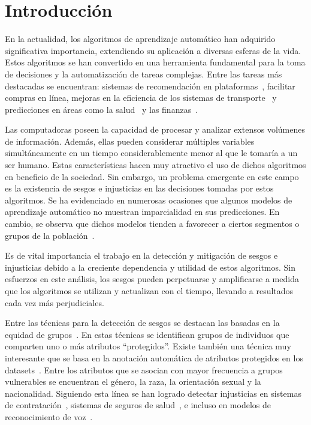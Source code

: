 \chapter*{Introducción}\label{chapter:introduction}
En la actualidad, los algoritmos de aprendizaje autom\'atico han adquirido significativa importancia, extendiendo su aplicaci\'on a 
diversas esferas de la vida. Estos algoritmos se han convertido en una herramienta fundamental para la toma de decisiones y la 
automatizaci\'on de tareas complejas. Entre las tareas m\'as destacadas se encuentran: sistemas de recomendaci\'on en 
plataformas~\parencite{esmaeilzadeh2022abuse, bhattacharya2022augmenting}, facilitar compras en l\'inea, mejoras en la eficiencia 
de los sistemas de transporte~\parencite{autonomous_driving} y predicciones en \'areas como la salud~\parencite{roy2023machine} y 
las finanzas~\parencite{sen2021machine}.

Las computadoras poseen la capacidad de procesar y analizar extensos vol\'umenes de informaci\'on. Adem\'as, ellas pueden considerar 
m\'ultiples variables simult\'aneamente en un tiempo considerablemente menor al que le tomar\'ia a un ser humano. Estas caracter\'isticas 
hacen muy atractivo el uso de dichos algoritmos en beneficio de la sociedad. Sin embargo, un problema emergente en este campo es la 
existencia de sesgos e injusticias en las decisiones tomadas por estos algoritmos. Se ha evidenciado en numerosas ocasiones que algunos 
modelos de aprendizaje autom\'atico no muestran imparcialidad en sus predicciones. En cambio, se observa que dichos modelos tienden a 
favorecer a ciertos segmentos o grupos de la poblaci\'on~\parencite{survey}.

Es de vital importancia el trabajo en la detecci\'on y mitigaci\'on de sesgos e injusticias debido a la creciente dependencia y 
utilidad de estos algoritmos. Sin esfuerzos en este an\'alisis, los sesgos pueden perpetuarse y amplificarse a medida 
que los algoritmos se utilizan y actualizan con el tiempo, llevando a resultados cada vez m\'as perjudiciales.

Entre las t\'ecnicas para la detecci\'on de sesgos se destacan las basadas en la equidad de grupos~\parencite{fairmodels}. 
En estas t\'ecnicas se identifican grupos de individuos que comparten uno o m\'as atributos ``protegidos''. Existe tambi\'en una 
t\'ecnica muy interesante que se basa en la anotaci\'on autom\'atica de atributos protegidos en los 
datasets~\parencite{soumah2023radar,dinan2020multidimensional,10.1007/978-3-031-35320-8_39}. Entre los atributos que se asocian 
con mayor frecuencia a grupos vulnerables se encuentran el g\'enero, la raza, la orientaci\'on sexual y la nacionalidad. 
Siguiendo esta l\'inea se han logrado detectar injusticias en sistemas de contrataci\'on~\parencite{examples_dis}, sistemas de 
seguros de salud~\parencite{examples_dis}, e incluso en modelos de reconocimiento de voz~\parencite{voice_bias}.

